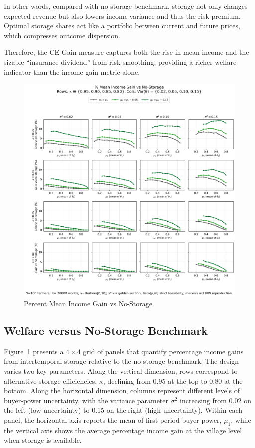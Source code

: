 In other words, compared with no-storage benchmark, storage not only changes expected revenue but also lowers income variance and thus the risk premium. Optimal storage shares act like a portfolio between current and future prices, which compresses outcome dispersion.  

Therefore, the CE-Gain measure captures both the rise in mean income and the sizable ``insurance dividend'' from risk smoothing, providing a richer welfare indicator than the income-gain metric alone.



\begin{figure}[ht!]
    \centering
    \includegraphics[width=\linewidth]{model_figures/gainpct_grid_4x4.png}
    \caption{Percent Mean Income Gain vs No-Storage}
    \label{fig: Income gains}
\end{figure}


\subsection{Welfare versus No-Storage Benchmark}
\noindent 
Figure~\ref{fig: Income gains} presents a $4\times4$ grid of panels that quantify percentage income gains from intertemporal storage relative to the no-storage benchmark. The design varies two key parameters. Along the vertical dimension, rows correspond to alternative storage efficiencies, $\kappa$, declining from 0.95 at the top to 0.80 at the bottom. Along the horizontal dimension, columns represent different levels of buyer-power uncertainty, with the variance parameter $\sigma^2$ increasing from 0.02 on the left (low uncertainty) to 0.15 on the right (high uncertainty). Within each panel, the horizontal axis reports the mean of first-period buyer power, $\mu_1$, while the vertical axis shows the average percentage income gain at the village level when storage is available.  

